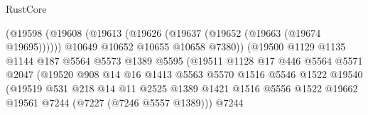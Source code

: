 \begin{lexlean}{RustCore}
\begin{coremodule}
                                      (@19598
                                        (@19608
                                          (@19613
                                            (@19626 (@19637 (@19652 (@19663 (@19674 @19695))))))
                                          @10649
                                          @10652
                                          @10655
                                          @10658
                                          @7380))
                                      (@19500
                                        @1129
                                        @1135
                                        @1144
                                        @187
                                        @5564
                                        @5573
                                        @1389
                                        @5595
                                        (@19511
                                          @1128
                                          @17
                                          @446
                                          @5564
                                          @5571
                                          @2047
                                          (@19520
                                            @908
                                            @14
                                            @16
                                            @1413
                                            @5563
                                            @5570
                                            @1516
                                            @5546
                                            @1522
                                            @19540
                                            (@19519
                                              @531
                                              @218
                                              @14
                                              @11
                                              @2525
                                              @1389
                                              @1421
                                              @1516
                                              @5556
                                              @1522
                                              @19662
                                              @19561
                                              @7244
                                              (@7227 (@7246 @5557 @1389)))
                                            @7244

\end{coremodule}
\end{lexlean}
